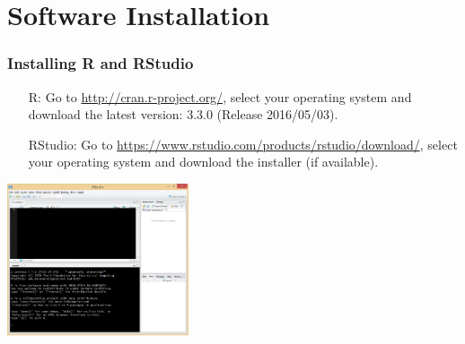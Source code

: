\section{Software Installation}
\begin{frame}[fragile]
  \frametitle{Installing R and RStudio}
  		\vspace{-5pt}
        \begin{enumerate}
           \item[R:] Go to \small \url{http://cran.r-project.org/}, select your operating system and download the latest version: 3.3.0 (Release 2016/05/03).
           \item[RStudio:] Go to \small \url{https://www.rstudio.com/products/rstudio/download/}, select your operating system and download the installer (if available).
        \end{enumerate}
%
		\vspace{-5pt}
       \begin{center}
         \includegraphics[width=0.4\textwidth]{images/Rwindow.png}
        \end{center}
\end{frame}


